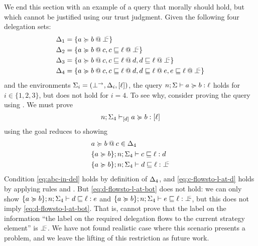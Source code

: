 We end this section with an example of a query that morally should hold, but which cannot be justified using our trust judgment. Given the following four delegation sets:
\begin{align*}
\scope_1 &= \{ \lb{\botinfoflow}{a \actsfor b} \} \\
\scope_2 &= \{ \lb{c}{a \actsfor b}, \lb{\botinfoflow}{c \flowsto \level} \} \\
\scope_3 &= \{ \lb{c}{a \actsfor b}, \lb{d}{c \flowsto \level}, \lb{\botinfoflow}{d \flowsto \level} \} \\
\scope_4 &= \{ \lb{c}{a \actsfor b}, \lb{d}{c \flowsto \level}, \lb{e}{d \flowsto \level}, \lb{\botinfoflow}{e \flowsto \level} \}
\end{align*}
and the environments $\Sigma_i = (\bot^{\rightarrow}, \Delta_i, \lbrack \ell \rbrack)$, the query $n; \Sigma \vdash a \succcurlyeq b : \ell$ holds for $i \in \{1, 2, 3\}$, but does not hold for $i = 4$. To see why, consider proving the query using . We must prove
\begin{equation*}
n; \Sigma_4 \vdash_{\lbrack d \rbrack} a \succcurlyeq b : \lbrack \ell \rbrack
\end{equation*}
using  the goal reduces to showing
\begin{align}
\label{eq:abc-in-del} &\lb{c}{a \actsfor b} \in \scope_4\\
\label{eq:c-flowsto-l-at-d} &\flowstoquery{\{a \actsfor b\}; n; \env_4}{c}{\level}{d}\\
\label{eq:d-flowsto-l-at-bot} &\flowstoquery{\{a \actsfor b\}; n; \env_4}{d}{\level}{\botinfoflow}
\end{align}
Condition \eqref{eq:abc-in-del} holds by definition of $\Delta_4$, and \eqref{eq:c-flowsto-l-at-d} holds by applying rules  and . But \eqref{eq:d-flowsto-l-at-bot} does not hold: we can only show $\{a \succcurlyeq b\}; n; \Sigma_4 \vdash d \sqsubseteq \ell : e$ and $\flowstoquery{\{a \actsfor b\}; n; \env_4}{e}{\level}{\botinfoflow}$, but this does not imply \eqref{eq:d-flowsto-l-at-bot}. That is, \lang{} cannot prove that the label on the information ``the label on the required delegation flows to the current strategy element'' is $\botinfoflow$. We have not found realistic case where this scenario presents a problem, and we leave the lifting of this restriction as future work.

